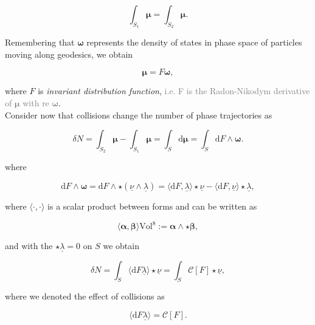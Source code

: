 \documentclass[11pt,a4paper,headinclude=true,DIV=14,BCOR=8mm,chapterprefix,listof=totoc,twoside,openright,abstracton]{scrbook}
\begin{document}
\begin{equation}
    \int_{S_1}\boldsymbol{\mu} = \int_{S_2}\boldsymbol{\mu}.
\end{equation}

Remembering that $\boldsymbol{\omega}$ represents the density of states in phase space of particles moving along geodesics, we obtain 

\begin{equation}
    \boldsymbol{\mu} = F\boldsymbol{\omega},
\end{equation}

where $F$ is \textit{invariant distribution function}, \textcolor{gray}{i.e. F is the Radon-Nikodym derivative of $\boldsymbol{\mu}$ with re $\boldsymbol{\omega}$}. \\

Consider now that collisions change the number of phase trajectories as 

\begin{equation}
    \delta N = \int_{S_2} \boldsymbol{\mu} - \int_{S_1}\boldsymbol{\mu} = \int_S \text{d}\boldsymbol{\mu} = \int_S \text{d}F\wedge\boldsymbol{\omega}.
\end{equation}

where 

\begin{equation}
    \text{d}F\wedge\boldsymbol{\omega} = \text{d}F\wedge\star (\underline{\nu}\wedge\underline{\lambda}) = \langle\text{d}F,\underline{\lambda}\rangle\star\underline{\nu} - \langle\text{d}F,\underline{\nu}\rangle\star\underline{\lambda},
\end{equation}

where $\langle\cdot,\cdot\rangle$ is a scalar product between forms and can be written as

\begin{equation}
    \langle\boldsymbol{\alpha},\boldsymbol{\beta}\rangle\text{Vol}^8 := \boldsymbol{\alpha}\wedge\star\boldsymbol{\beta},
\end{equation}

and with the $\star\underline{\lambda}=0$ on $S$ we obtain 

\begin{equation}
    \delta N = \int_S\langle\text{d}F\underline{\lambda}\rangle\star\underline{\nu} = \int_S\mathcal{C}[F]\star\underline{\nu},
\end{equation}

where we denoted the effect of collisions as

\begin{equation}
    \langle\text{d}F\underline{\lambda}\rangle = \mathcal{C}[F].
\end{equation}
\end{document}
